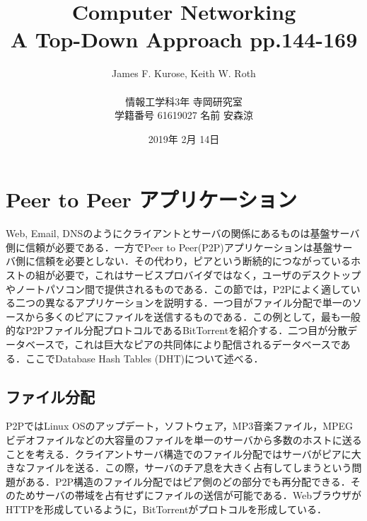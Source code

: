 \documentclass[9pt,a4j,twocolumn]{jsarticle}
\title{
    Computer Networking\\
    A Top-Down Approach pp.144-169
}
\author{
    James F. Kurose, Keith W. Roth
    \\\\
    情報工学科3年 寺岡研究室\\
    学籍番号 61619027 名前 安森涼
}
\date{2019年 2月 14日}
\begin{document}
\maketitle

\section{Peer to Peer アプリケーション}
Web, Email, DNSのようにクライアントとサーバの関係にあるものは基盤サーバ側に信頼が必要である．一方でPeer to Peer(P2P)アプリケーションは基盤サーバ側に信頼を必要としない．その代わり，ピアという断続的につながっているホストの組が必要で，これはサービスプロバイダではなく，ユーザのデスクトップやノートパソコン間で提供されるものである．この節では，P2Pによく適している二つの異なるアプリケーションを説明する．一つ目がファイル分配で単一のソースから多くのピアにファイルを送信するものである．この例として，最も一般的なP2Pファイル分配プロトコルであるBitTorrentを紹介する．二つ目が分散データベースで，これは巨大なピアの共同体により配信されるデータベースである．ここでDatabase Hash Tables (DHT)について述べる．
\\
\subsection{ファイル分配}
P2PではLinux OSのアップデート，ソフトウェア，MP3音楽ファイル，MPEGビデオファイルなどの大容量のファイルを単一のサーバから多数のホストに送ることを考える．クライアントサーバ構造でのファイル分配ではサーバがピアに大きなファイルを送る．この際，サーバのチア息を大きく占有してしまうという問題がある．P2P構造のファイル分配ではピア側のどの部分でも再分配できる．そのためサーバの帯域を占有せずにファイルの送信が可能である．WebブラウザがHTTPを形成しているように，BitTorrentがプロトコルを形成している．
\\
\end{document}
